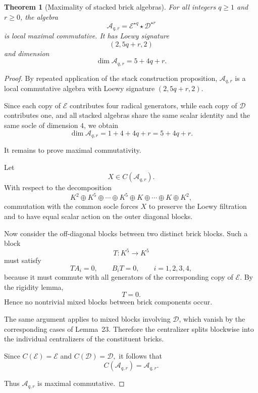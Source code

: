 \documentclass[11pt]{article}
\theoremstyle{remark}
\theoremstyle{plain}
\newtheorem{theorem}{Theorem}
\theoremstyle{definition}
\theoremstyle{myremark}
\begin{document}
\begin{theorem}[Maximality of stacked brick algebras]
	For all integers \(q\ge 1\) and \(r\ge 0\), the algebra
	\[
	\mathcal A_{q,r}=\mathcal E^{\star q}\star\mathcal D^{\star r}
	\]
	is local maximal commutative. It has Loewy signature
	\[
	(2,5q+r,2)
	\]
	and dimension
	\[
	\dim \mathcal A_{q,r}=5+4q+r.
	\]
\end{theorem}

\begin{proof}
	By repeated application of the stack construction proposition,
	$\mathcal A_{q,r}$
	is a local commutative algebra with Loewy signature $(2,5q+r,2).$
	
	Since each copy of \(\mathcal E\) contributes four radical generators,
	while each copy of \(\mathcal D\) contributes one, and all stacked
	algebras share the same scalar identity and the same socle of dimension
	\(4\), we obtain
	\[
	\dim \mathcal A_{q,r}=1+4+4q+r=5+4q+r.
	\]
	
	It remains to prove maximal commutativity.
	
	Let
	\[
	X\in C(\mathcal A_{q,r}).
	\]
	With respect to the decomposition
	\[
	K^2
	\oplus
	K^5
	\oplus\cdots\oplus
	K^5
	\oplus
	K
	\oplus\cdots\oplus
	K
	\oplus
	K^2,
	\]
	commutation with the common socle forces \(X\) to preserve the Loewy
	filtration and to have equal scalar action on the outer diagonal blocks.
	
	Now consider the off-diagonal blocks between two distinct brick blocks.
	Such a block
	\[
	T:K^5\to K^5
	\]
	must satisfy
	\[
	TA_i=0,
	\qquad
	B_iT=0,
	\qquad i=1,2,3,4,
	\]
	because it must commute with all generators of the corresponding copy of
	\(\mathcal E\).
	By the rigidity lemma,
	\[
	T=0.
	\]
	Hence no nontrivial mixed blocks between brick components occur.
	
The same argument applies to mixed blocks involving \(\mathcal D\), which vanish
by the corresponding cases of Lemma~23. Therefore the centralizer splits
blockwise into the individual centralizers of the constituent bricks.
	
	Since $	C(\mathcal E)=\mathcal E$
	and $C(\mathcal D)=\mathcal D,$
	it follows that
	\[
	C(\mathcal A_{q,r})=\mathcal A_{q,r}.
	\]
	
	Thus $\mathcal A_{q,r}$
	is maximal commutative.
\end{proof}



\end{document}
